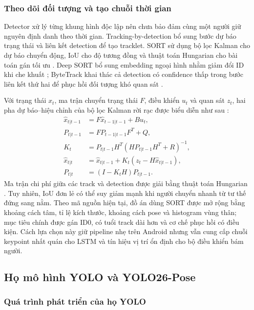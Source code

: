 \subsubsection{Theo dõi đối tượng và tạo chuỗi thời gian}

Detector xử lý từng khung hình độc lập nên chưa bảo đảm cùng một người giữ nguyên định danh theo thời gian. Tracking-by-detection bổ sung bước dự báo trạng thái và liên kết detection để tạo tracklet. SORT sử dụng bộ lọc Kalman cho dự báo chuyển động, IoU cho độ tương đồng và thuật toán Hungarian cho bài toán gán tối ưu . Deep SORT bổ sung embedding ngoại hình nhằm giảm đổi ID khi che khuất ; ByteTrack khai thác cả detection có confidence thấp trong bước liên kết thứ hai để phục hồi đối tượng khó quan sát .

Với trạng thái $x_t$, ma trận chuyển trạng thái $F$, điều khiển $u_t$ và quan sát $z_t$, hai pha dự báo--hiệu chỉnh của bộ lọc Kalman rời rạc được biểu diễn như sau :
\begin{align}
\hat{x}_{t|t-1}&=F\hat{x}_{t-1|t-1}+Bu_t,\\
P_{t|t-1}&=FP_{t-1|t-1}F^T+Q,\\
K_t&=P_{t|t-1}H^T(HP_{t|t-1}H^T+R)^{-1},\\
\hat{x}_{t|t}&=\hat{x}_{t|t-1}+K_t(z_t-H\hat{x}_{t|t-1}),\\
P_{t|t}&=(I-K_tH)P_{t|t-1}.
\end{align}
Ma trận chi phí giữa các track và detection được giải bằng thuật toán Hungarian . Tuy nhiên, IoU đơn lẻ có thể suy giảm mạnh khi người chuyển nhanh từ tư thế đứng sang nằm. Theo mã nguồn hiện tại, đồ án dùng SORT được mở rộng bằng khoảng cách tâm, tỉ lệ kích thước, khoảng cách pose và histogram vùng thân; mục tiêu chính được gán ID0, có tuổi track dài hơn và cơ chế phục hồi có điều kiện. Cách lựa chọn này giữ pipeline nhẹ trên Android nhưng vẫn cung cấp chuỗi keypoint nhất quán cho LSTM và tín hiệu vị trí ổn định cho bộ điều khiển bám người.

\subsection{Họ mô hình YOLO và YOLO26-Pose}

\subsubsection{Quá trình phát triển của họ YOLO}


